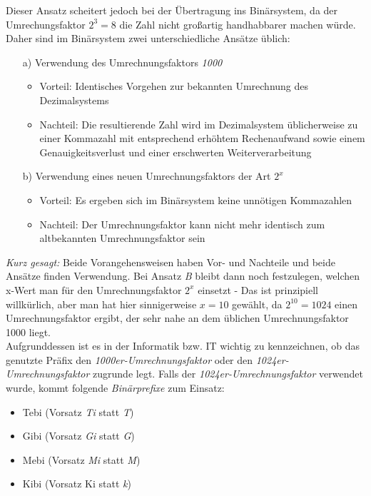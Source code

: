\documentclass[a4paper, 12pt]{report}
\begin{document}
\begin{multicols}{2}
Dieser Ansatz scheitert jedoch bei der Übertragung ins Binärsystem, da der
Umrechungsfaktor \emph{$2^3 = 8$} die Zahl nicht großartig handhabbarer machen
würde. Daher sind im Binärsystem zwei unterschiedliche Ansätze üblich:

\begin{itemize}
    \item[a)] Verwendung des Umrechnungsfaktors \emph{1000}
	\begin{itemize}
	    \item Vorteil: Identisches Vorgehen zur bekannten Umrechnung des
		Dezimalsystems
	    \item Nachteil: Die resultierende Zahl wird im Dezimalsystem
		üblicherweise zu einer Kommazahl mit entsprechend erhöhtem
		Rechenaufwand sowie einem Genauigkeitsverlust und einer
		erschwerten Weiterverarbeitung
	\end{itemize}
    \item[b)] Verwendung eines neuen Umrechnungsfaktors der Art $2^x$
	\begin{itemize}
	    \item Vorteil: Es ergeben sich im Binärsystem keine unnötigen
		Kommazahlen
	    \item Nachteil: Der Umrechnungsfaktor kann nicht mehr identisch zum
		altbekannten Umrechnungsfaktor sein
	\end{itemize}
\end{itemize}

\emph{Kurz gesagt:}  Beide Vorangehensweisen haben Vor- und Nachteile und beide
Ansätze finden Verwendung. Bei Ansatz \emph{B} bleibt dann noch festzulegen,
welchen x-Wert man für den Umrechnungsfaktor $2^x$ einsetzt - Das ist
prinzipiell willkürlich, aber man hat hier sinnigerweise $x = 10$ gewählt, da
$2^10 = 1024$ einen Umrechnungsfaktor ergibt, der sehr nahe an dem üblichen
Umrechnungsfaktor 1000 liegt. \\

Aufgrunddessen ist es in der Informatik bzw. IT wichtig zu kennzeichnen, ob
das genutzte Präfix den \emph{1000er-Umrechnungsfaktor} oder den
\emph{1024er-Umrechnungsfaktor} zugrunde legt. Falls der
\emph{1024er-Umrechnungsfaktor} verwendet wurde, kommt folgende
\emph{Binärprefixe} zum Einsatz:

\begin{itemize}
    \item Tebi (Vorsatz \emph{Ti} statt \emph{T})
    \item Gibi (Vorsatz \emph{Gi} statt \emph{G})
    \item Mebi (Vorsatz \emph{Mi} statt \emph{M})
    \item Kibi (Vorsatz {Ki} statt \emph{k})
\end{itemize}


\end{multicols}
\end{document}
